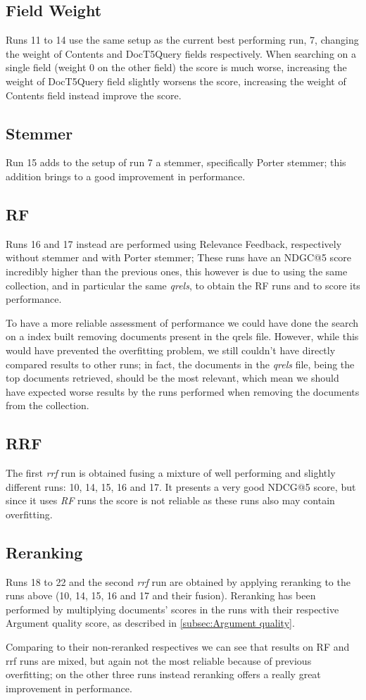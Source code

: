 \subsection{Field Weight}
Runs 11 to 14 use the same setup as the current best performing run, 7, changing the weight of Contents and DocT5Query fields respectively.
When searching on a single field (weight 0 on the other field) the score is much worse, increasing the weight of DocT5Query field slightly worsens the score, increasing the weight of Contents field instead improve the score.

\subsection{Stemmer}
Run 15 adds to the setup of run 7 a stemmer, specifically Porter stemmer; this addition brings to a good improvement in performance.

\subsection{RF}
Runs 16 and 17 instead are performed using Relevance Feedback, respectively without stemmer and with Porter stemmer; These runs have an NDGC@5 score incredibly higher than the previous ones, this however is due to using the same collection, and in particular the same \textit{qrels}, to obtain the RF runs and to score its performance.

To have a more reliable assessment of performance we could have done the search on a index built removing documents present in the qrels file. However, while this would have prevented the overfitting problem, we still couldn't have directly compared results to other runs; in fact, the documents in the \textit{qrels} file, being the top documents retrieved, should be the most relevant, which mean we should have expected worse results by the runs performed when removing the documents from the collection.

\subsection{RRF}
The first \textit{rrf} run is obtained fusing a mixture of well performing and slightly different runs: 10, 14, 15, 16 and 17. It presents a very good NDCG@5 score, but since it uses \textit{RF} runs the score is not reliable as these runs also may contain overfitting.

\subsection{Reranking}
Runs 18 to 22 and the second \textit{rrf} run are obtained by applying reranking to the runs above (10, 14, 15, 16 and 17 and their fusion).
Reranking has been performed by multiplying documents' scores in the runs with their respective Argument quality score, as described in \ref{subsec:Argument quality}.

Comparing to their non-reranked respectives we can see that results on RF and rrf runs are mixed, but again not the most reliable because of previous overfitting; on the other three runs instead reranking offers a really great improvement in performance.